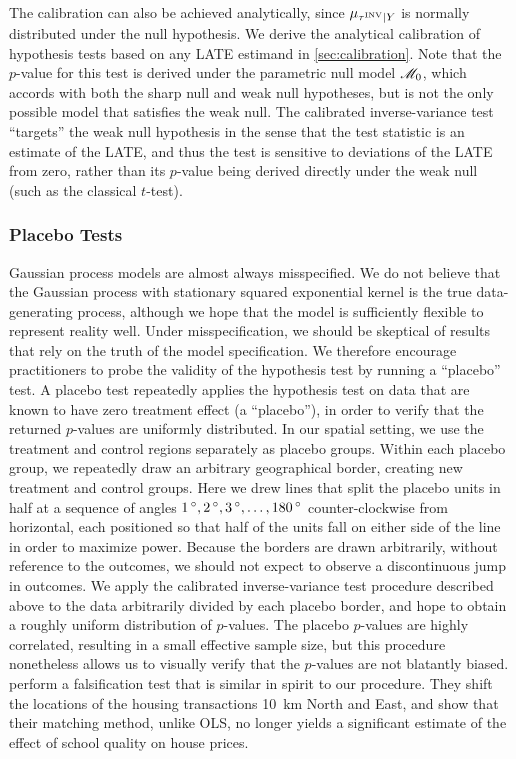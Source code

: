The calibration can also be achieved analytically, since \(\mu_{\tau^{\mathrm{INV}} \mid Y}\) is normally distributed under the null hypothesis.
We derive the analytical calibration of hypothesis tests based on any LATE estimand in \autoref{sec:calibration}.
Note that the \(p\)-value for this test is derived under the parametric null model \(\mathscr{M}_0\), which accords with both the sharp null and weak null hypotheses, but is not the only possible model that satisfies the weak null.
The calibrated inverse-variance test “targets” the weak null hypothesis in the sense that the test statistic is an estimate of the LATE, and thus the test is sensitive to deviations of the LATE from zero, rather than its \(p\)-value being derived directly under the weak null (such as the classical \(t\)-test).

\label{eq:calib_test}

\subsubsection{Placebo Tests}
\label{sec:placebo}
Gaussian process models are almost always misspecified.
We do not believe that the Gaussian process with stationary squared exponential kernel is the true data-generating process, although we hope that the model is sufficiently flexible to represent reality well.
Under misspecification, we should be skeptical of results that rely on the truth of the model specification.
We therefore encourage practitioners to probe the validity of the hypothesis test by running a ``placebo'' test.
A placebo test repeatedly applies the hypothesis test on data that are known to have zero treatment effect (a ``placebo''),
in order to verify that the returned \(p\)-values are uniformly distributed.
In our spatial setting, we use the treatment and control regions separately as placebo groups.
Within each placebo group, we repeatedly draw an arbitrary geographical border, creating new treatment and control groups.
Here we drew lines that split the placebo units in half at a sequence of angles \(1{\,^\circ},2{\,^\circ},3{\,^\circ},\dotsc,180{\,^\circ}\) counter-clockwise from horizontal, each positioned so that half of the units fall on either side of the line in order to maximize power.
Because the borders are drawn arbitrarily, without reference to the outcomes, we should not expect to observe a discontinuous jump in outcomes.
We apply the calibrated inverse-variance test procedure described above to the data arbitrarily divided by each placebo border, and hope to obtain a roughly uniform distribution of \(p\)-values.
The placebo \(p\)-values are highly correlated, resulting in a small effective sample size, but this procedure nonetheless allows us to visually verify that the \(p\)-values are not blatantly biased.
\citet{gibbons2013valuing} perform a falsification test that is similar in spirit to our procedure. They shift the locations of the housing transactions 10~km North and East, and show that their matching method, unlike OLS, no longer yields a significant estimate of the effect of school quality on house prices.

